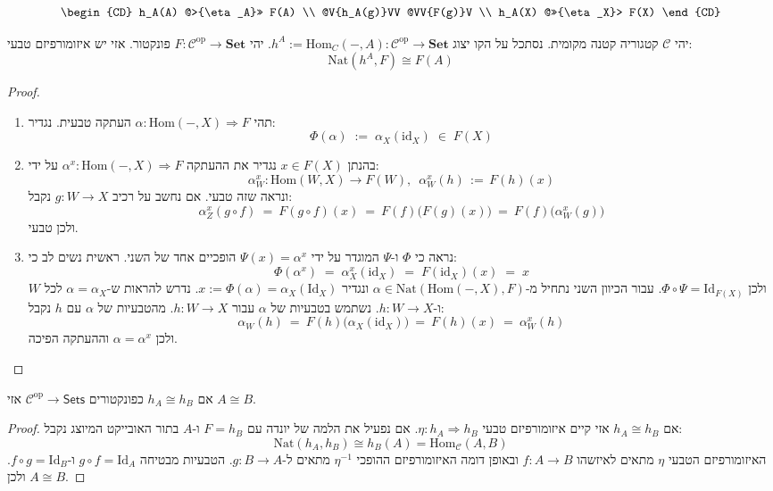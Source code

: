 \documentclass{tstextbook}
\begin{document}
$$\begin{CD} h_A(A) @>{\eta_A}>> F(A) \\ @V{h_A(g)}VV @VV{F(g)}V \\ h_A(X) @>>{\eta_X}> F(X) \end{CD} $$

\begin{proposition}
יהי \(\mathcal{C}\) קטגוריה קטנה מקומית. נסתכל על הקו יצוג \(h^{A}:=\mathrm{Hom}_{C}(-,A):{\mathcal C}^{\mathrm{op}}\to\mathbf{Set}\). יהי \(F: \mathcal{C}^{\mathrm{op}} \to \mathbf{Set}\) פונקטור. אזי יש איזומורפיזם טבעי:
$$\mathrm{Nat}(h^{A},F)\cong F(A)$$

\end{proposition}
\begin{proof}
  \begin{enumerate}
    \item תהי \(\alpha:\mathrm{Hom}(-,X)\Rightarrow F\) העתקה טבעית. נגדיר: 
$$\Phi(\alpha)\;:=\;\alpha_{X}(\mathrm{id}_{X})\;\in\;F(X)$$


    \item בהנתן \(x \in F(X)\) נגדיר את ההעתקה \(\alpha^{x}:\mathrm{Hom}(-,X)\Rightarrow F\) על ידי: 
$$\alpha_{W}^{x}:\mathrm{Hom}(W,X)\to F(W),\,\,\,\alpha_{W}^{x}(h)\,:=\,F(h)(x)$$
ונראה שזה טבעי. אם נחשב על רכיב \(g:W\to X\) נקבל:
$$\alpha_{Z}^{x}(g\circ f)\:=\:F(g\circ f)(x)\:=\:F(f)\bigl(F(g)(x)\bigr)\:=\:F(f)\bigl(\alpha_{W}^{x}(g)\bigr)$$
ולכן טבעי.


    \item נראה כי \(\Phi\) ו-\(\Psi\) המוגדר על ידי \(\Psi(x)=\alpha^{x}\) הופכיים אחד של השני. ראשית נשים לב כי: 
$$\Phi(\alpha^{x})\;=\;\alpha_{X}^{x}(\mathrm{id}_{X})\;=\;F(\mathrm{id}_{X})(x)\;=\;x$$
ולכן \(\Phi \circ \Psi=\mathrm{Id}_{F(X)}\). עבור הכיוון השני נתחיל מ-\(\alpha \in \mathrm{Nat}\left( \mathrm{Hom}(-,X),F \right)\) ונגדיר \(x:= \Phi\left( \alpha \right)=\alpha_{X}\left( \mathrm{Id}_{X} \right)\). נדרש להראות ש-\(\alpha=\alpha_{X}\) לכל \(W\) ו-\(h:W\to X\). נשתמש בטבעיות של \(\alpha\) עבור \(h:W\to X\). מהטבעיות של \(\alpha\) עם \(h\) נקבל:
$$\alpha_{W}(h)\:=\:F(h)\big(\alpha_{X}(\mathrm{id}_{X})\big)\:=\:F(h)(x)\:=\:\alpha_{W}^{x}(h)$$
ולכן \(\alpha=\alpha^{x}\) וההעתקה הפיכה.


  \end{enumerate}
\end{proof}
\begin{proposition}
אם \(h_{A}\cong h_{B}\) כפונקטורים \(\mathcal{C}^{\text{op}}\to \mathsf{Sets}\) אזי \(A\cong B\).

\end{proposition}
\begin{proof}
אם \(h_{A}\cong h_{B}\) אזי קיים איזומורפיזם טבעי \(\eta:h_{A}\Rightarrow h_{B}\). אם נפעיל את הלמה של יונדה עם \(F=h_{B}\) ו-\(A\) בתור האובייקט המיוצג נקבל:
$$\mathrm{Nat}(h_{A},h_{B})\cong h_{B}(A)=\mathrm{Hom}_{\mathcal{C} }(A,B)$$
האיזומורפיזם הטבעי \(\eta\) מתאים לאיזשהו \(f:A\to B\) ובאופן דומה האיזומורפיזם ההופכי \(\eta ^{-1}\) מתאים ל-\(g:B\to A\). הטבעיות מבטיחה \(g \circ f=\mathrm{Id}_{A}\) ו-\(f \circ g=\mathrm{Id}_{B}\). ולכן \(A\cong B\).

\end{proof}
\end{document}
